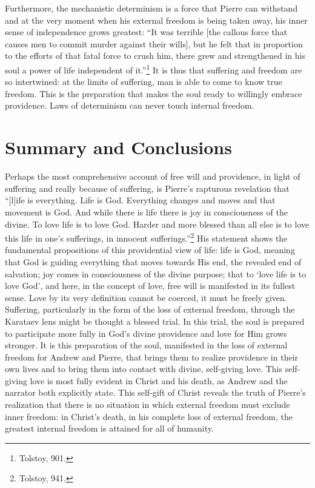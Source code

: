 \documentclass[12pt]{article}
\begin{document}
Furthermore, the mechanistic determinism is a force that Pierre can withstand and at the very moment when his external freedom is being taken away, his inner sense of independence grows greatest: ``It was terrible [the callous force that causes men to commit murder against their wills], but he felt that in proportion to the efforts of that fatal force to crush him, there grew and strengthened in his soul a power of life independent of it.''\footnote{Tolstoy, 901.} It is thus that suffering and freedom are so intertwined: at the limits of suffering, man is able to come to know true freedom. This is the preparation that makes the soul ready to willingly embrace providence. Laws of determinism can never touch internal freedom.

\section{Summary and Conclusions}

Perhaps the most comprehensive account of free will and providence, in light of suffering and really because of suffering, is Pierre's rapturous revelation that ``[l]ife is everything. Life is God. Everything changes and moves and that movement is God. And while there is life there is joy in consciousness of the divine. To love life is to love God. Harder and more blessed than all else is to love this life in one's sufferings, in innocent sufferings.''\footnote{Tolstoy, 941.} His statement shows the fundamental propositions of this providential view of life: life is God, meaning that God is guiding everything that moves towards His end, the revealed end of salvation; joy comes in consciousness of the divine purpose; that to `love life is to love God', and here, in the concept of love, free will is manifested in its fullest sense. Love by its very definition cannot be coerced, it must be freely given. Suffering, particularly in the form of the loss of external freedom, through the Karataev lens might be thought a blessed trial. In this trial, the soul is prepared to participate more fully in God's divine providence and love for Him grows stronger. It is this preparation of the soul, manifested in the loss of external freedom for Andrew and Pierre, that brings them to realize providence in their own lives and to bring them into contact with divine, self-giving love. This self-giving love is most fully evident in Christ and his death, as Andrew and the narrator both explicitly state. This self-gift of Christ reveals the truth of Pierre's realization that there is no situation in which external freedom must exclude inner freedom: in Christ's death, in his complete loss of external freedom, the greatest internal freedom is attained for all of humanity.
\end{document}
